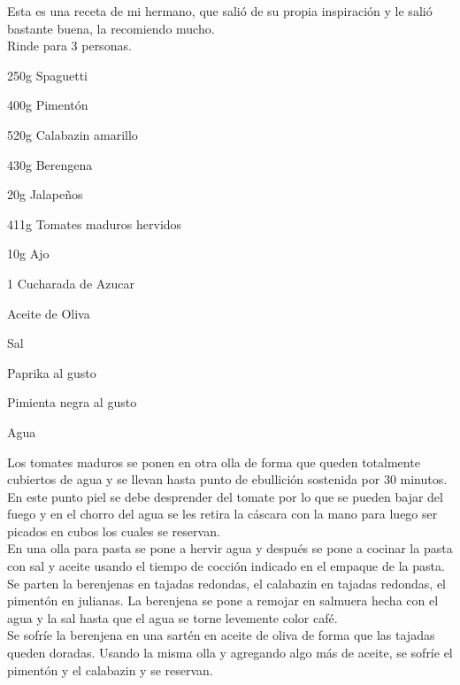 
Esta es una receta de mi hermano, que salió de su propia inspiración y le salió bastante buena, la recomiendo mucho.\\

Rinde para 3 personas.\\

\begin{ingredientes}
\item 250g Spaguetti
\item 400g Pimentón
\item 520g Calabazin amarillo
\item 430g Berengena
\item 20g Jalapeños
\item 411g Tomates maduros hervidos
\item 10g Ajo
\item 1 Cucharada de Azucar
\item Aceite de Oliva
\item Sal
\item Paprika al gusto
\item Pimienta negra al gusto
\item Agua
\end{ingredientes}
\preparacion
Los tomates maduros se ponen en otra olla de forma que queden totalmente cubiertos de agua y se llevan hasta punto de ebullición sostenida por 30 minutos. En este punto piel se debe desprender del tomate por lo que se pueden bajar del fuego y en el chorro del agua se les retira la cáscara con la mano para luego ser picados en cubos los cuales se reservan.\\

En una olla para pasta se pone a hervir agua y después se pone a cocinar la pasta con sal y aceite usando el tiempo de cocción indicado en el empaque de la pasta.\\

Se parten la berenjenas en tajadas redondas, el calabazin en tajadas redondas, el pimentón en julianas. La berenjena se pone a remojar en salmuera hecha con el agua y la sal hasta que el agua se torne levemente color café.\\

Se sofríe la berenjena en una sartén en aceite de oliva de forma que las tajadas queden doradas. Usando la misma olla y agregando algo más de aceite, se sofríe el pimentón y el calabazin y se reservan.\\

